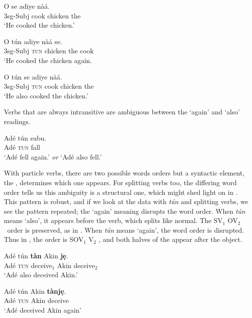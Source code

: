 \documentclass[output=paper]{LSP/langsci}
\begin{document}
\ea 
 \ea 
   \gll O se adiye n\`{a}\'{a}. \\
   3sg-Subj cook chicken the \\
   \glt `He cooked the chicken.'
   \label{ex:parrish:reg}
   
   \ex 
   \gll O t\'{u}n adiye n\`{a}\'{a} se. \\
   3sg-Subj {\textsc{tun}} chicken the cook \\
   \glt `He cooked the chicken again.
   \label{ex:parrish:again}
   

   
   \ex 
   \gll O t\'{u}n se adiye n\`{a}\'{a}. \\
   3sg-Subj {\textsc{tun}} cook chicken the \\
   \glt `He also cooked the chicken.'
   \label{ex:parrish:also}
 \z 
\z


Verbs that are always intransitive are ambiguous between the `again' and `also' readings.

\ea 
   \gll Ad\'{e} t\'{u}n subu. \\
   Ad\'{e} {\textsc{tun}} fall \\
   \glt `Ad\'{e} fell again.' \textit{or} `Ad\'{e} also fell.'
   \label{ex:parrish:intransitive}
\z

With  particle verbs, there are two possible words orders but a syntactic element, the , determines which one appears. For splitting verbs too, the differing word order tells us this ambiguity is a structural one, which might shed light on  in . This pattern is robust, and if we look at the data with \textit{t\'{u}n} and splitting verbs, we see the pattern repeated; the ‘again’ meaning disrupts the word order. When \textit{t\'{u}n} means ‘also’, it appears before the verb, which splits like normal. The SV$_{1}$ OV$_{2}$\ order is preserved, as in . When \textit{t\'{u}n} means ‘again’, the word order is disrupted. Thus in , the order is SOV$_{1}$ V$_{2}$ , and both halves of the  appear after the object.


\ea 
 \ea 
   \gll Ad\'{e} t\'{u}n \textbf{t\`{a}n} Akin \textbf{j\d{e}}. \\
   Ad\'{e} {\textsc{tun}} {deceive$_{1}$} Akin {deceive$_{2}$} \\
   \glt `Ad\'{e} also deceived Akin.'
   \label{ex:parrish:tun-Bill-je}
   
  \ex 
   \gll Ad\'{e} t\'{u}n Akin \textbf{t\`{a}nj\d{e}}. \\
   Ad\'{e} {\textsc{tun}} Akin deceive \\
   \glt `Ad\'{e} deceived Akin again'
   \label{ex:parrish:Bill-tanje}
 \z 
\z
\end{document}
